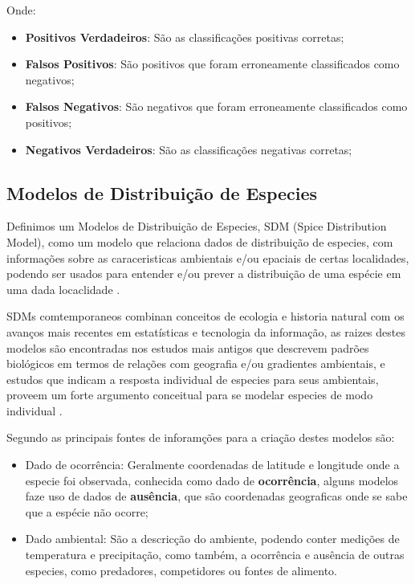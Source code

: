 \documentclass[
	12pt,				%
	openright,			%
	oneside,			%
	a4paper,			%
	english,			%
	brazil				%
	]{abntex2}
\begin{document}
Onde:
\begin{itemize}
	\item \textbf{Positivos Verdadeiros}: São as classificações positivas corretas;
	\item \textbf{Falsos Positivos}: São positivos que foram erroneamente classificados como negativos;
	\item \textbf{Falsos Negativos}: São negativos que foram erroneamente classificados como positivos;
	\item \textbf{Negativos Verdadeiros}: São as classificações negativas corretas;
\end{itemize}

\subsection{Modelos de Distribuição de Especies}

Definimos um Modelos de Distribuição de Especies, SDM (Spice Distribution Model), como um modelo que relaciona dados de 
distribuição de especies, com informações sobre as caraceristicas ambientais e/ou epaciais de certas localidades, podendo 
ser usados para entender e/ou prever a distribuição de uma espécie em uma dada locaclidade \cite{speciesDistributionModels}.

SDMs comtemporaneos combinan conceitos de ecologia e historia natural com os avanços mais recentes em estatísticas e
tecnologia da informação, as raizes destes modelos são encontradas nos estudos mais antigos que descrevem padrões
biológicos em termos de relações com geografia e/ou gradientes ambientais, e estudos que indicam a resposta individual
de especies para seus ambientais, proveem um forte argumento conceitual para se modelar especies de modo individual 
\cite{speciesDistributionModels}.

Segundo \cite{tiposDados_sdm} as principais fontes de inforamções para a criação destes modelos são: 
\begin{itemize}
	\item Dado de ocorrência: Geralmente coordenadas de latitude e longitude onde a especie foi observada, conhecida como
	dado de \textbf{ocorrência}, alguns modelos faze uso de dados de \textbf{ausência}, que são coordenadas geograficas 
	onde se sabe que a espécie não ocorre;
	\item Dado ambiental: São a descricção do ambiente, podendo conter medições de temperatura e precipitação, como
	também, a ocorrência e ausência de outras especies, como predadores, competidores ou fontes de alimento.
\end{itemize}
\end{document}
